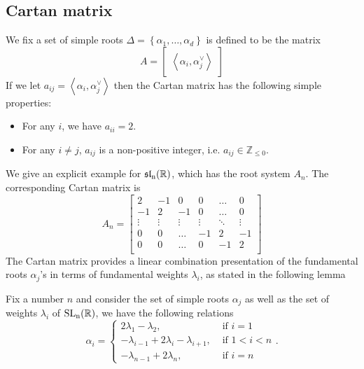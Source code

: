 \subsection{Cartan matrix}
We fix a set of simple roots $\Delta = \left\lbrace \alpha_1,\ldots,\alpha_d \right\rbrace$ is defined to be the matrix
\[A = \begin{bmatrix} \left\langle \alpha_i,\alpha_j^\vee  \right\rangle
    \end{bmatrix}\]
If we let $a_{ij}=  \left\langle \alpha_i,\alpha_j^\vee\right\rangle$ then the Cartan matrix has the following simple properties:
\begin{lemma}
    \hfill
    \begin{itemize}
        \item For any $i$, we have $a_{ii}=2$.
        \item For any $i \ne j$, $a_{ij}$ is a non-positive integer, i.e. $a_{ij} \in \mathbb{Z}_{\le 0}$.
    \end{itemize}
\end{lemma}
We give an explicit example for $\operatorname{\mathfrak{sl}_n(\mathbb{R})}$, which has the root system $A_n$. The corresponding Cartan matrix is
\[A_n = \begin{bmatrix}
        2      & -1     & 0      & 0      & \ldots & 0      \\
        -1     & 2      & -1     & 0      & \ldots & 0      \\
        \vdots & \vdots & \vdots & \vdots & \ddots & \vdots \\
        0      & 0      & \ldots & -1     & 2      & -1     \\
        0      & 0      & \ldots & 0      & -1     & 2      \\
    \end{bmatrix}\]
The Cartan matrix provides a linear combination presentation of the fundamental roots $\alpha_j$'s in terms of fundamental weights $\lambda_i$,
as stated in the following lemma
\begin{lemma}\label{weight-root-comb}
    Fix a number $n$ and consider the set of simple roots $\alpha_j$ as well as the set of weights $\lambda_i$ of $\operatorname{\text{SL}_n(\mathbb{R})}$, we have the following relations
    \[\alpha_i = \begin{cases}
            2\lambda_1-\lambda_2,                    & \mbox{ if } i = 1 \\
            -\lambda_{i-1}+2\lambda_i-\lambda_{i+1}, & \mbox{ if } 1<i<n \\
            -\lambda_{n-1}+2\lambda_n,               & \mbox{ if } i =n
        \end{cases}.\]
\end{lemma}
